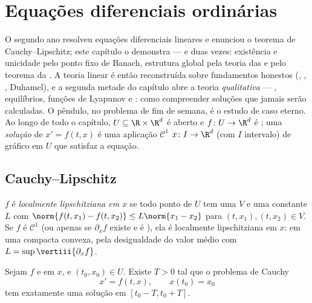 \chapter{Equações diferenciais ordinárias}\label{ch:b3:ode}

O segundo ano resolveu equações diferenciais lineares e enunciou o
teorema de Cauchy--Lipschitz; este capítulo o demonstra --- e duas
vezes: existência e unicidade pelo ponto fixo de Banach, estrutura
global pela teoria das  e pelo teorema da . A teoria linear é então reconstruída sobre fundamentos
honestos (, , , Duhamel), e a
segunda metade do capítulo abre a teoria \emph{qualitativa} --- ,
equilíbrios, funções de Lyapunov e : como
compreender soluções que jamais serão calculadas. O pêndulo, no problema
de fim de semana, é o estudo de caso eterno. Ao longo de todo o
capítulo, $U \subseteq \R\times\R^d$ é aberto e $f \colon U \to \R^d$ é ; uma \emph{solução} de $x' = f(t, x)$ é
uma aplicação $\mathcal C^1$ $x \colon I \to \R^d$ (com $I$ intervalo) de gráfico em $U$ que
satisfaz a equação.

\section{Cauchy--Lipschitz}

\begin{definition}\label{def:b3:ode:lipschitz}
$f$ é \emph{localmente lipschitziana em $x$} se todo ponto de $U$ tem uma  $V$ e uma
constante $L$ com $\norm{f(t, x_1) - f(t, x_2)} \leq L\norm{x_1 -
x_2}$ para $(t, x_1), (t, x_2) \in V$. Se $f$ é $\mathcal
C^1$ (ou apenas se
$\partial_xf$ existe e é ), ela é localmente lipschitziana em $x$: em
uma  compacta convexa, pela desigualdade do valor médio com
$L =
\sup\vertiii{\partial_xf}$.
\end{definition}

\begin{theorem}
\label{thm:b3:ode:cauchylipschitz}
Sejam $f$  e  em $x$, e $(t_0,
x_0) \in U$.
Existe $T > 0$ tal que o problema de Cauchy
\[
x' = f(t, x), \qquad x(t_0) = x_0
\]
tem exatamente uma solução em $[t_0 - T, t_0 +
T]$.
\end{theorem}

